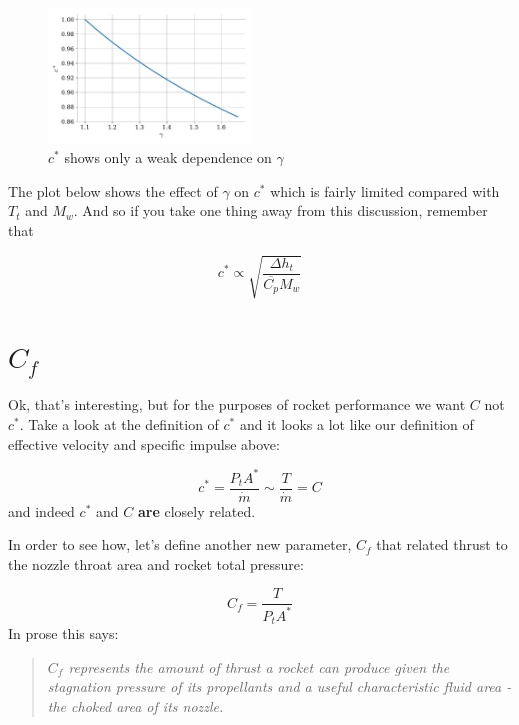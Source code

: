 \documentclass[twocolumn]{memoir} %
\begin{document}
\begin{figure}[H]
    \includegraphics[width=0.48\textwidth]{cstar_gamma}
    \caption{$c^*$ shows only a weak dependence on $\gamma$}
\end{figure}

The plot below shows the effect of $\gamma$ on $c^*$ which is fairly
limited compared with $T_t$ and $M_w$. And so if you take one thing
away from this discussion, remember that

\begin{equation}c^* \propto \sqrt{\frac{\Delta h_t}{\overline{C_p} M_w}}
\end{equation}

\section{$C_f$}

Ok, that's interesting, but for the purposes of rocket performance we
want \(C\) not \(c^*\). Take a look at the definition of \(c^*\) and it
looks a lot like our definition of effective velocity and specific
impulse above:

\begin{equation}c^* = \frac{P_t A^*}{\dot{m}} \sim \frac{T}{\dot{m}} = C
\end{equation}
%
and indeed \(c^*\) and \(C\) \textbf{are} closely related.

In order to see how, let's define another new parameter, \(C_f\) that
related thrust to the nozzle throat area and rocket total pressure:

\begin{equation}C_f = \frac{T}{P_t A^*}
\end{equation}
%
In prose this says:
%
\begin{quote}
    \emph{\(C_f\) represents the amount of thrust a rocket can produce given the
stagnation pressure of its propellants and a useful characteristic fluid
    area - the choked area of its nozzle.}
\end{quote}
\end{document}
